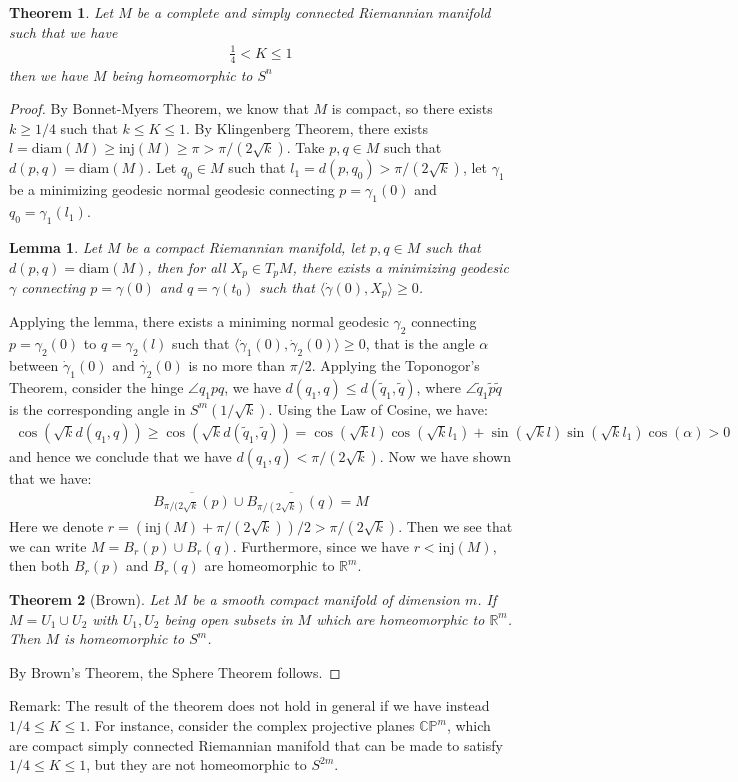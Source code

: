\documentclass[11pt]{book}
\theoremstyle{break}
\theoremstyle{break}
\newtheorem{thm}{Theorem}[section]
\newtheorem{lem}{Lemma}[thm]
\newcommand{\R}{\mathbb{R}}
\newcommand{\C}{\mathbb{C}}
\newcommand{\that}[1]{\widetilde{#1}}
\newcommand{\remark}{\color{blue}Remark: \color{black}}
\begin{document}
\begin{thm}
Let $M$ be a complete and simply connected Riemannian manifold such that we have
\begin{align*}
 \frac{1}{4}< K \leq 1
\end{align*}
then we have $M$ being homeomorphic to $S^n$
\end{thm}
\begin{proof}
By Bonnet-Myers Theorem, we know that $M$ is compact, so there exists $k \geq 1/4$ such that $k\leq K \leq 1$. By Klingenberg Theorem, there exists $l = \text{diam}(M) \geq \text{inj}(M) \geq \pi > \pi/(2\sqrt{k})$. Take $p,q \in M$ such that $d(p,q) = \text{diam}(M)$. Let $q_0 \in M$ such that $l_1 = d(p,q_0)> \pi/(2\sqrt{k})$, let $\gamma_1$ be a minimizing geodesic normal geodesic connecting $p = \gamma_1(0)$ and $q_0 = \gamma_1(l_1)$. 
\begin{lem}
Let $M$ be a compact Riemannian manifold, let $p,q \in M$ such that $d(p,q) = \text{diam}(M)$, then for all $X_p \in T_pM$, there exists a minimizing geodesic $\gamma$ connecting $p = \gamma(0)$ and $q = \gamma(t_0)$ such that $\langle \dot{\gamma}(0) , X_p \rangle \geq 0$. 
\end{lem}
Applying the lemma, there exists a miniming normal geodesic $\gamma_2$ connecting $p = \gamma_2(0)$ to $q = \gamma_2(l)$ such that $\langle \dot{\gamma}_1(0), \dot{\gamma}_2(0)\rangle \geq 0$, that is the angle $\alpha$ between $\dot{\gamma}_1(0)$ and $\dot{\gamma_2}(0)$ is no more than $\pi/2$. Applying the Toponogor's Theorem, consider the hinge $\angle q_1 p q$, we have $d(q_1,q) \leq d(\that{q}_1, \that{q})$, where $\angle \that{q}_1\that{p}\that{q}$ is the corresponding angle in $S^m(1/\sqrt{k})$. Using the Law of Cosine, we have:
\begin{align*}
\cos(\sqrt{k}d(q_1,q)) \geq \cos(\sqrt{k}d(\that{q}_1,\that{q})) = \cos(\sqrt{k}l) \cos(\sqrt{k}l_1) + \sin(\sqrt{k}l) \sin(\sqrt{k}l_1) \cos(\alpha)>0
\end{align*}
and hence we conclude that we have $d(q_1,q) < \pi/(2\sqrt{k})$. Now we have shown that we have:
\begin{align*}
\overline{B_{\pi/(2\sqrt{k}}(p)} \cup \overline{B_{\pi/(2\sqrt{k})}(q)} = M
\end{align*}
Here we denote $r = (\text{inj}(M) + \pi/(2\sqrt{k})) / 2 > \pi/(2\sqrt{k})$. Then we see that we can write $M = B_r(p) \cup B_r(q)$. Furthermore, since we have $r< \text{inj}(M)$, then both $B_r(p)$ and $B_r(q)$ are homeomorphic to $\R^m$. 
\begin{thm}[Brown]
Let $M$ be a smooth compact manifold of dimension $m$. If $M = U_1 \cup U_2$ with $U_1,U_2$ being open subsets in $M$ which are homeomorphic to $\R^m$. Then $M$ is homeomorphic to $S^m$. 
\end{thm}
By Brown's Theorem, the Sphere Theorem follows. 
\end{proof}
\remark The result of the theorem does not hold in general if we have instead $1/4 \leq K \leq 1$. For instance, consider the complex projective planes $\C\mathbb{P}^m$, which are compact simply connected Riemannian manifold that can be made to satisfy $1/4 \leq K \leq 1$, but they are not homeomorphic to $S^{2m}$. 
\end{document}
